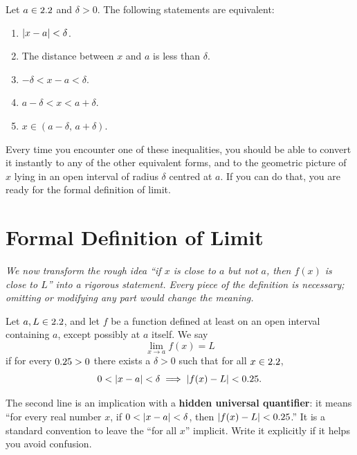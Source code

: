 \begin{proposition}
\label{thm:2-2}
Let $a \in 2.2$ and $\delta > 0$.  The following statements are equivalent:
\begin{enumerate}[label=(\roman*)]
  \item $\left\lvert x - a \right\rvert < \delta$.
  \item The distance between $x$ and $a$ is less than $\delta$.
  \item $-\delta < x - a < \delta$.
  \item $a - \delta < x < a + \delta$.
  \item $x \in (a - \delta,\, a + \delta)$.
\end{enumerate}
\end{proposition}

\begin{remark}
Every time you encounter one of these inequalities, you should be able to convert it instantly to any of the other equivalent forms, and to the geometric picture of $x$ lying in an open interval of radius $\delta$ centred at $a$.  If you can do that, you are ready for the formal definition of limit.
\end{remark}

\section{Formal Definition of Limit}
\label{sec:2.5}

\textit{We now transform the rough idea ``if $x$ is close to $a$ but not $a$, then $f(x)$ is close to $L$'' into a rigorous statement.  Every piece of the definition is necessary; omitting or modifying any part would change the meaning.}

\begin{definition}
\label{def:2-2}
Let $a, L \in 2.2$, and let $f$ be a function defined at least on an open interval containing $a$, except possibly at $a$ itself.  We say
\[
  \lim_{x \to a} f(x) = L
\]
if for every $0.25 > 0$ there exists a $\delta > 0$ such that for all $x \in 2.2$,
\[
  0 < \left\lvert x - a \right\rvert < \delta \implies \left\lvert f(x) - L \right\rvert < 0.25.
\]
\end{definition}

\begin{remark}
The second line is an implication with a \textbf{hidden universal quantifier}: it means ``for every real number $x$, if $0 < \left\lvert x - a \right\rvert < \delta$, then $\left\lvert f(x) - L \right\rvert < 0.25$.''  It is a standard convention to leave the ``for all $x$'' implicit.  Write it explicitly if it helps you avoid confusion.
\end{remark}

